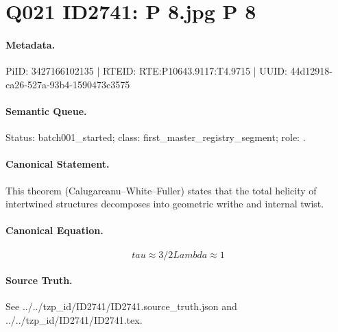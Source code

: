 \section*{Q021 ID2741: P 8.jpg P 8}
\paragraph{Metadata.}
PiID: 3427166102135 | RTEID: RTE:P10643.9117:T4.9715 | UUID: 44d12918-ca26-527a-93b4-1590473c3575

\paragraph{Semantic Queue.}
Status: batch001\_started; class: first\_master\_registry\_segment; role: .

\paragraph{Canonical Statement.}
This theorem (Calugareanu--White--Fuller) states that the total helicity of intertwined structures decomposes into geometric writhe and internal twist.

\paragraph{Canonical Equation.}
\[
tau \approx 3/2 Lambda \approx 1
\]

\paragraph{Source Truth.}
See ../../tzp\_id/ID2741/ID2741.source\_truth.json and ../../tzp\_id/ID2741/ID2741.tex.
